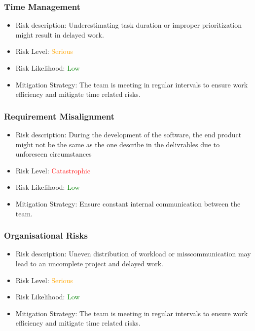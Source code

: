 \documentclass{article}
\begin{document}
\subsubsection{Time Management}
\begin{itemize}
    \item Risk description: Underestimating  task duration or improper prioritization might result in delayed work.
    \item Risk Level: \textcolor{orange}{Serious}
    \item Risk Likelihood: \textcolor{green}{Low}
    \item Mitigation Strategy: The team is meeting in regular intervals to ensure work efficiency and mitigate time related risks.
\end{itemize}

\subsubsection{Requirement Misalignment}
\begin{itemize}
    \item Risk description: During the development of the software, the end product might not be the same as the one describe in the delivrables due to unforeseen circumstances
    \item Risk Level: \textcolor{red}{Catastrophic}
    \item Risk Likelihood: \textcolor{green}{Low}
    \item Mitigation Strategy: Ensure constant internal communication between the team.
\end{itemize}

\subsubsection{Organisational Risks}
\begin{itemize}
    \item Risk description: Uneven distribution of workload or misscommunication may lead to an uncomplete project and delayed work. 
    \item Risk Level: \textcolor{orange}{Serious}
    \item Risk Likelihood: \textcolor{green}{Low}
    \item Mitigation Strategy: The team is meeting in regular intervals to ensure work efficiency and mitigate time related risks.
\end{itemize}
\end{document}
